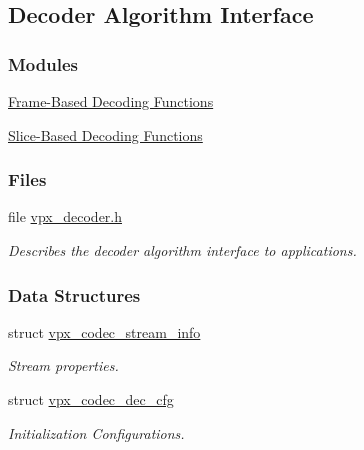\hypertarget{group__decoder}{\subsection{Decoder Algorithm Interface}
\label{group__decoder}
}
\subsubsection*{Modules}
\begin{DoxyCompactItemize}
\item 
\hyperlink{group__cap__put__frame}{Frame-\/\+Based Decoding Functions}
\item 
\hyperlink{group__cap__put__slice}{Slice-\/\+Based Decoding Functions}
\end{DoxyCompactItemize}
\subsubsection*{Files}
\begin{DoxyCompactItemize}
\item 
file \hyperlink{vpx__decoder_8h}{vpx\+\_\+decoder.\+h}
\begin{DoxyCompactList}\small\item\em Describes the decoder algorithm interface to applications. \end{DoxyCompactList}\end{DoxyCompactItemize}
\subsubsection*{Data Structures}
\begin{DoxyCompactItemize}
\item 
struct \hyperlink{structvpx__codec__stream__info}{vpx\+\_\+codec\+\_\+stream\+\_\+info}
\begin{DoxyCompactList}\small\item\em Stream properties. \end{DoxyCompactList}\item 
struct \hyperlink{structvpx__codec__dec__cfg}{vpx\+\_\+codec\+\_\+dec\+\_\+cfg}
\begin{DoxyCompactList}\small\item\em Initialization Configurations. \end{DoxyCompactList}\end{DoxyCompactItemize}
